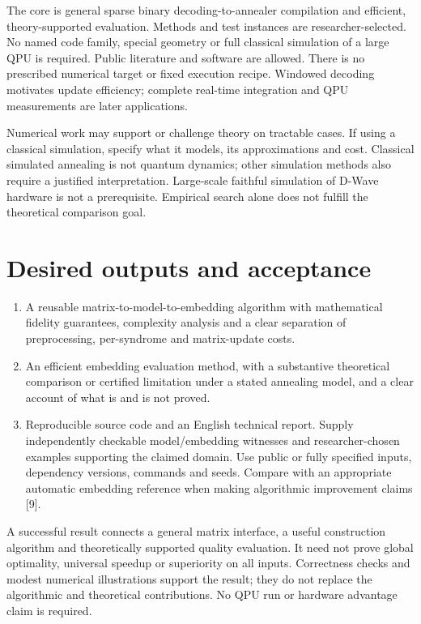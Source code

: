 \documentclass[11pt,letterpaper]{article}
\begin{document}
The core is general sparse binary decoding-to-annealer compilation and efficient, theory-supported evaluation. Methods and test instances are researcher-selected. No named code family, special geometry or full classical simulation of a large QPU is required. Public literature and software are allowed. There is no prescribed numerical target or fixed execution recipe. Windowed decoding motivates update efficiency; complete real-time integration and QPU measurements are later applications.\par

Numerical work may support or challenge theory on tractable cases. If using a classical simulation, specify what it models, its approximations and cost. Classical simulated annealing is not quantum dynamics; other simulation methods also require a justified interpretation. Large-scale faithful simulation of D-Wave hardware is not a prerequisite. Empirical search alone does not fulfill the theoretical comparison goal.\par

\section{Desired outputs and acceptance}

\begin{enumerate}\item A reusable matrix-to-model-to-embedding algorithm with mathematical fidelity guarantees, complexity analysis and a clear separation of preprocessing, per-syndrome and matrix-update costs.
\item An efficient embedding evaluation method, with a substantive theoretical comparison or certified limitation under a stated annealing model, and a clear account of what is and is not proved.
\item Reproducible source code and an English technical report. Supply independently checkable model/embedding witnesses and researcher-chosen examples supporting the claimed domain. Use public or fully specified inputs, dependency versions, commands and seeds. Compare with an appropriate automatic embedding reference when making algorithmic improvement claims [9].\end{enumerate}

A successful result connects a general matrix interface, a useful construction algorithm and theoretically supported quality evaluation. It need not prove global optimality, universal speedup or superiority on all inputs. Correctness checks and modest numerical illustrations support the result; they do not replace the algorithmic and theoretical contributions. No QPU run or hardware advantage claim is required.\par
\end{document}
